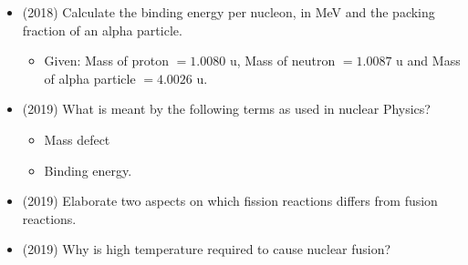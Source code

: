 \documentclass{article}
\begin{document}
\begin{itemize}
\item (2018)  Calculate the binding energy per nucleon, in MeV and the packing fraction of an alpha particle.
 \begin{itemize}
\item Given: Mass of proton $ =1.0080$ u, Mass of neutron $ =1.0087$ u and Mass of alpha particle $ =4.0026$ u.
\end{itemize}
\item (2019)  What is meant by the following terms as used in nuclear Physics?
 \begin{itemize}
\item Mass defect 
\item Binding energy. 
\end{itemize}
\item (2019)  Elaborate two aspects on which fission reactions differs from fusion reactions.
\item (2019)  Why is high temperature required to cause nuclear fusion? 
\end{itemize}
\end{document}
